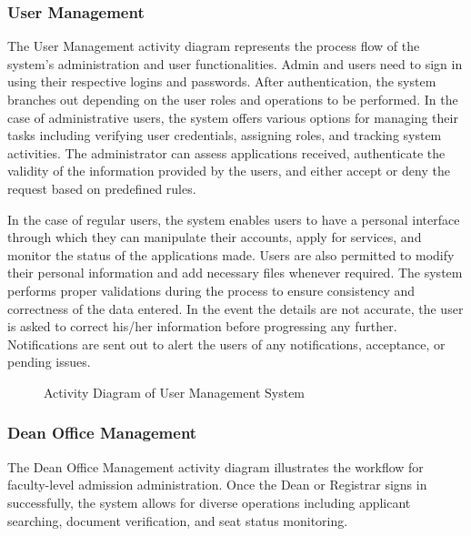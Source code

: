 \subsubsection{User Management}

The User Management activity diagram represents the process flow of the system's administration and user functionalities. Admin and users need to sign in using their respective logins and passwords. After authentication, the system branches out depending on the user roles and operations to be performed. In the case of administrative users, the system offers various options for managing their tasks including verifying user credentials, assigning roles, and tracking system activities. The administrator can assess applications received, authenticate the validity of the information provided by the users, and either accept or deny the request based on predefined rules.

\vspace{0.5cm}

\noindent In the case of regular users, the system enables users to have a personal interface through which they can manipulate their accounts, apply for services, and monitor the status of the applications made. Users are also permitted to modify their personal information and add necessary files whenever required. The system performs proper validations during the process to ensure consistency and correctness of the data entered. In the event the details are not accurate, the user is asked to correct his/her information before progressing any further. Notifications are sent out to alert the users of any notifications, acceptance, or pending issues.


\begin{figure}[H] %
\centering

\caption{Activity Diagram of User Management System}
\label{fig:user_management_activity}
\end{figure}

\subsubsection{Dean Office Management}

The Dean Office Management activity diagram illustrates the workflow for faculty-level admission administration. Once the Dean or Registrar signs in successfully, the system allows for diverse operations including applicant searching, document verification, and seat status monitoring.

